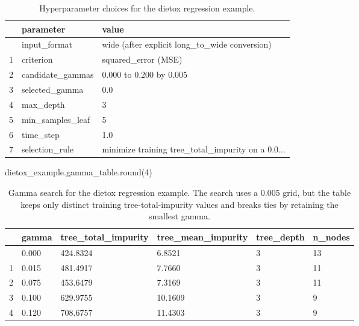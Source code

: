\documentclass[
  letterpaper,
  DIV=11,
  numbers=noendperiod]{scrartcl}
\newenvironment{Shaded}{\begin{snugshade}}{\end{snugshade}}
\newcommand{\BuiltInTok}[1]{\textcolor[rgb]{0.00,0.23,0.31}{#1}}
\newcommand{\DecValTok}[1]{\textcolor[rgb]{0.68,0.00,0.00}{#1}}
\newcommand{\NormalTok}[1]{\textcolor[rgb]{0.00,0.23,0.31}{#1}}
\begin{document}
\begin{longtable}[]{@{}lll@{}}

\caption{\label{tbl-dietox-hyperparameters}Hyperparameter choices for
the dietox regression example.}

\tabularnewline

\toprule\noalign{}
& parameter & value \\
\midrule\noalign{}
\endhead
\bottomrule\noalign{}
\endlastfoot
0 & input\_format & wide (after explicit long\_to\_wide conversion) \\
1 & criterion & squared\_error (MSE) \\
2 & candidate\_gammas & 0.000 to 0.200 by 0.005 \\
3 & selected\_gamma & 0.0 \\
4 & max\_depth & 3 \\
5 & min\_samples\_leaf & 5 \\
6 & time\_step & 1.0 \\
7 & selection\_rule & minimize training tree\_total\_impurity on a
0.0... \\

\end{longtable}

\begin{Shaded}
\begin{Highlighting}[]
\NormalTok{dietox\_example.gamma\_table.}\BuiltInTok{round}\NormalTok{(}\DecValTok{4}\NormalTok{)}
\end{Highlighting}
\end{Shaded}

\begin{longtable}[]{@{}llllll@{}}

\caption{\label{tbl-dietox-gamma-search}Gamma search for the dietox
regression example. The search uses a 0.005 grid, but the table keeps
only distinct training tree-total-impurity values and breaks ties by
retaining the smallest gamma.}

\tabularnewline

\toprule\noalign{}
& gamma & tree\_total\_impurity & tree\_mean\_impurity & tree\_depth &
n\_nodes \\
\midrule\noalign{}
\endhead
\bottomrule\noalign{}
\endlastfoot
0 & 0.000 & 424.8324 & 6.8521 & 3 & 13 \\
1 & 0.015 & 481.4917 & 7.7660 & 3 & 11 \\
2 & 0.075 & 453.6479 & 7.3169 & 3 & 11 \\
3 & 0.100 & 629.9755 & 10.1609 & 3 & 9 \\
4 & 0.120 & 708.6757 & 11.4303 & 3 & 9 \\

\end{longtable}
\end{document}
